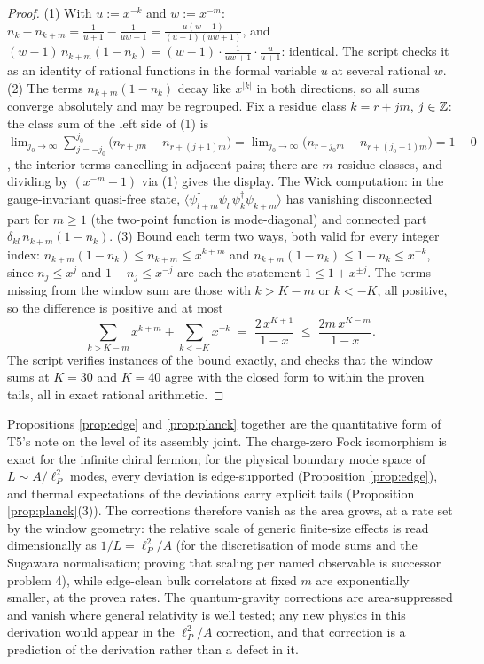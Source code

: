 \begin{proof}
(1) With $u := x^{-k}$ and $w := x^{-m}$: $n_k - n_{k+m} = \tfrac{1}{u+1} - \tfrac{1}{uw+1} = \tfrac{u(w-1)}{(u+1)(uw+1)}$, and $(w-1)\,n_{k+m}(1-n_k) = (w-1)\cdot\tfrac{1}{uw+1}\cdot\tfrac{u}{u+1}$: identical. The script checks it as an identity of rational functions in the formal variable $u$ at several rational $w$.
(2) The terms $n_{k+m}(1 - n_k)$ decay like $x^{|k|}$ in both directions, so all sums converge absolutely and may be regrouped. Fix a residue class $k = r + jm$, $j \in \mathbb{Z}$: the class sum of the left side of (1) is $\lim_{j_0 \to \infty}\sum_{j=-j_0}^{j_0}\bigl(n_{r+jm} - n_{r+(j+1)m}\bigr) = \lim_{j_0 \to \infty}\bigl(n_{r-j_0 m} - n_{r+(j_0+1)m}\bigr) = 1 - 0$, the interior terms cancelling in adjacent pairs; there are $m$ residue classes, and dividing by $(x^{-m}-1)$ via (1) gives the display. The Wick computation: in the gauge-invariant quasi-free state, $\langle \psi^\dagger_{l+m}\psi_l\,\psi^\dagger_k\psi_{k+m}\rangle$ has vanishing disconnected part for $m \ge 1$ (the two-point function is mode-diagonal) and connected part $\delta_{kl}\,n_{k+m}(1 - n_k)$.
(3) Bound each term two ways, both valid for every integer index: $n_{k+m}(1-n_k) \le n_{k+m} \le x^{k+m}$ and $n_{k+m}(1-n_k) \le 1 - n_k \le x^{-k}$, since $n_j \le x^j$ and $1 - n_j \le x^{-j}$ are each the statement $1 \le 1 + x^{\pm j}$. The terms missing from the window sum are those with $k > K - m$ or $k < -K$, all positive, so the difference is positive and at most
\[
\sum_{k > K-m} x^{k+m} + \sum_{k < -K} x^{-k} \;=\; \frac{2\,x^{K+1}}{1-x} \;\le\; \frac{2m\,x^{K-m}}{1-x}.
\]
The script verifies instances of the bound exactly, and checks that the window sums at $K = 30$ and $K = 40$ agree with the closed form to within the proven tails, all in exact rational arithmetic.
\end{proof}

\begin{remark}\label{rem:seam}
Propositions \ref{prop:edge} and \ref{prop:planck} together are the quantitative form of T5's note on the level of its assembly joint. The charge-zero Fock isomorphism is exact for the infinite chiral fermion; for the physical boundary mode space of $L \sim A/\ell_P^2$ modes, every deviation is edge-supported (Proposition \ref{prop:edge}), and thermal expectations of the deviations carry explicit tails (Proposition \ref{prop:planck}(3)). The corrections therefore vanish as the area grows, at a rate set by the window geometry: the relative scale of generic finite-size effects is read dimensionally as $1/L = \ell_P^2/A$ (for the discretisation of mode sums and the Sugawara normalisation; proving that scaling per named observable is successor problem 4), while edge-clean bulk correlators at fixed $m$ are exponentially smaller, at the proven rates. The quantum-gravity corrections are area-suppressed and vanish where general relativity is well tested; any new physics in this derivation would appear in the $\ell_P^2/A$ correction, and that correction is a prediction of the derivation rather than a defect in it.
\end{remark}

